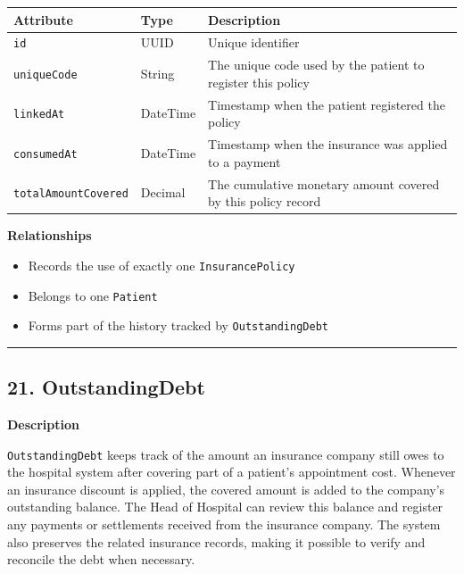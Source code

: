 \documentclass[12pt, a4paper]{article}
\begin{document}
\begin{center}
\small
\renewcommand{\arraystretch}{1.35}
\begin{tabularx}{\textwidth}{|>{\raggedright\arraybackslash}p{3.4cm}|>{\raggedright\arraybackslash}p{3.3cm}|Y|}
\hline
{}
\textbf{Attribute} & \textbf{Type} & \textbf{Description} \\ \hline
\texttt{id} & UUID & Unique identifier \\ \hline
\texttt{uniqueCode} & String & The unique code used by the patient to register this policy \\ \hline
\texttt{linkedAt} & DateTime & Timestamp when the patient registered the policy \\ \hline
\texttt{consumedAt} & DateTime & Timestamp when the insurance was applied to a payment \\ \hline
\texttt{totalAmountCovered} & Decimal & The cumulative monetary amount covered by this policy record \\ \hline
\end{tabularx}
\end{center}

\textbf{Relationships}

\begin{itemize}
    \item Records the use of exactly one \texttt{InsurancePolicy}
    \item Belongs to one \texttt{Patient}
    \item Forms part of the history tracked by \texttt{OutstandingDebt}
\end{itemize}

\par\medskip\hrule\medskip

\subsection{21. OutstandingDebt}\label{sec:21-outstandingdebt}

\textbf{Description}

\texttt{OutstandingDebt} keeps track of the amount an insurance company still owes to the hospital system after covering part of a patient's appointment cost. Whenever an insurance discount is applied, the covered amount is added to the company's outstanding balance. The Head of Hospital can review this balance and register any payments or settlements received from the insurance company. The system also preserves the related insurance records, making it possible to verify and reconcile the debt when necessary.
\end{document}
